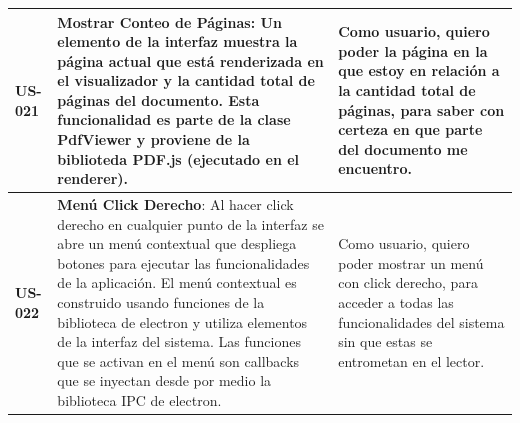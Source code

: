 \begin{longtable}{|l||p{7cm}|p{4.5cm}|}
\hline
\textbf{US-021} & \textbf{Mostrar Conteo de Páginas}: Un elemento de la interfaz muestra la página actual que está renderizada en el visualizador y la cantidad total de páginas del documento.  Esta funcionalidad es parte de la clase PdfViewer y proviene de la biblioteda PDF.js (ejecutado en el renderer). & Como usuario, quiero poder la página en la que estoy en relación a la cantidad total de páginas, para saber con certeza en que parte del documento me encuentro.\\
\hline
\textbf{US-022} & \textbf{Menú Click Derecho}: Al hacer click derecho en cualquier punto de la interfaz se abre un menú contextual que despliega botones para ejecutar las funcionalidades de la aplicación. El menú contextual es construido usando funciones de la biblioteca de electron y utiliza elementos de la interfaz del sistema. Las funciones que se activan en el menú son callbacks que se inyectan desde por medio la biblioteca IPC de electron. & Como usuario, quiero poder mostrar un menú con click derecho, para acceder a todas las funcionalidades del sistema sin que estas se entrometan en el lector.\\
\hline
\end{longtable}

